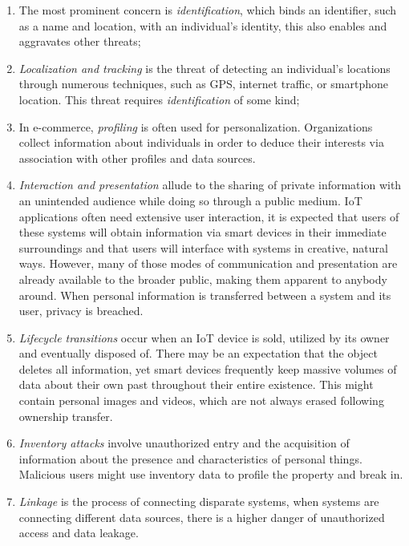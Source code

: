 \documentclass[manuscript,natbib=false]{acmart}
\begin{document}
\begin{enumerate}
    \item
    The most prominent concern is \textit{identification}, which binds an
    identifier, such as a name and location, with an individual's identity,
    this also enables and aggravates other threats;
    \item
    \textit{Localization and tracking} is the threat of detecting an individual's
    locations through numerous techniques, such as GPS, internet traffic,
    or smartphone location. This threat requires \textit{identification}
    of some kind;
    \item
    In e-commerce, \textit{profiling} is often used for personalization.
    Organizations collect information about individuals in order to deduce
    their interests via association with other profiles and data sources.
    \item
    \textit{Interaction and presentation} allude to the sharing of private
    information with an unintended audience while doing so through a public
    medium. IoT applications often need extensive user interaction, it is
    expected that users of these systems will obtain information via smart
    devices in their immediate surroundings and that users will interface
    with systems in creative, natural ways. However, many of those modes
    of communication and presentation are already available to the broader
    public, making them apparent to anybody around. When personal information
    is transferred between a system and its user, privacy is breached.
    \item
    \textit{Lifecycle transitions} occur when an IoT device is sold, utilized
    by its owner and eventually disposed of. There may be an expectation
    that the object deletes all information, yet smart devices frequently
    keep massive volumes of data about their own past throughout their entire
    existence. This might contain personal images and videos, which are
    not always erased following ownership transfer.
    \item
    \textit{Inventory attacks} involve unauthorized entry and the acquisition
    of information about the presence and characteristics of personal things.
    Malicious users might use inventory data to profile the property and
    break in.
    \item
    \textit{Linkage} is the process of connecting disparate systems, when
    systems are connecting different data sources, there is a higher danger
    of unauthorized access and data leakage.
\end{enumerate}
\end{document}
